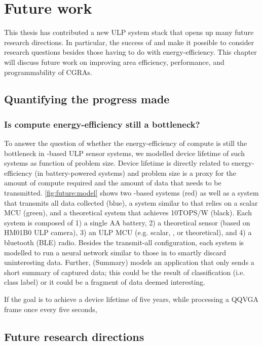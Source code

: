 \chapter{Future work}
\label{chapter:future}
This thesis has contributed a new ULP system stack that opens up many future research directions.
% 
In particular, the success of \snafu and \riptide make it possible to consider research questions besides those having to do with energy-efficiency.
% 
This chapter will discuss future work on improving area efficiency, performance, and programmability of CGRAs.

\section{Quantifying the progress made}

\figFutureModel
\subsection{Is compute energy-efficiency still a bottleneck?}
To answer the question of whether the energy-efficiency of compute is still the bottleneck in \riptide-based ULP sensor systems, we modelled device lifetime of such systems as function of problem size.
%
Device lifetime is directly related to energy-efficiency (in battery-powered systems) and problem size is a proxy for the amount of compute required and the amount of data that needs to be transmitted.
% 
\autoref{fig:future:model} shows two \riptide-based systems (red) as well as a system that transmits all data collected (blue), a system similar to \sonic that relies on a scalar MCU (green), and a theoretical system that achieves 10TOPS/W (black).
% 
Each system is composed of 1) a single AA battery, 2) a theoretical sensor (based on HM01B0 ULP camera), 3) an ULP MCU (e.g. scalar, \riptide, or theoretical), and 4) a bluetooth (BLE) radio.
% 
Besides the transmit-all configuration, each system is modelled to run a neural network similar to those in \sonic to smartly discard uninteresting data.
% 
Further, \riptide (Summary) models an application that only sends a short summary of captured data; this could be the result of classification (i.e. class label) or it could be a fragment of data deemed interesting.

If the goal is to achieve a device lifetime of five years, while processing a QQVGA frame once every five seconds, 


\section{Future research directions}
